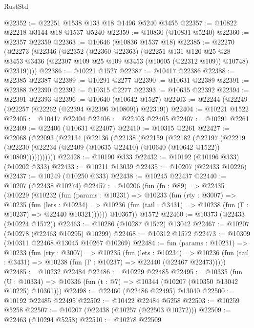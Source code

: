 \begin{lexlean}{RustStd}
\begin{coremodule}
@22352 := @22251 @1538 @133 @18 @1496 @5240 @3455
@22357 := @10822 @22218 @3144 @18 @1537 @5240
@22359 := @10830 (@10831 @5240)
@22360 := @22357 @22359
@22363 := @10646 (@10836 @1537 @18)
@22385 := @22270
    (@22273
      (@22346
        (@22352
          (@22360 @22363)
          (@22251
            @131
            @120
            @25
            @28
            @3453
            @3436
            (@22307 @109 @25 @109 @3453 (@10605 (@22312 @109)) @10748)
            @22319))))
@22386 := @10221 @1527
@22387 := @10417 @22386
@22388 := @22385 @22387
@22389 := @10291 @2277
@22390 := @10631 @22389
@22391 := @22388 @22390
@22392 := @10315 @2277
@22393 := @10635 @22392
@22394 := @22391 @22393
@22396 := @10640 (@10642 @1527)
@22403 := @22244 (@22249 (@22257 (@22262 (@22394 @22396 @10809)) @22319))
@22404 := @10221 @1522
@22405 := @10417 @22404
@22406 := @22403 @22405
@22407 := @10291 @2261
@22409 := @22406 (@10631 @22407)
@22410 := @10315 @2261
@22427 := @22068
    (@22093
      (@22134
        (@22136
          (@22138
            (@22159
              (@22182
                (@22197
                  (@22219
                    (@22230
                      (@22234 (@22409 (@10635 @22410) (@10640 (@10642 @1522)) @10809)))))))))))
@22428 := @10190 @333
@22432 := @10192 (@10196 @333) (@10202 @333)
@22433 := @10211 @13039
@22435 := @10207 (@22433 @10226)
@22437 := @10249 (@10250 @333)
@22438 := @10245 @22437
@22440 := @10207 (@22438 @10274)
@22457 := @10206
    (fun (fn : @89) =>
    @22435
      (@10229
        (@10232
          (fun (params : @10231) =>
          @10233
            (fun (rty : @3007) =>
            @10235
              (fun (lets : @10234) =>
              @10236 (fun (tail : @3431) => @10238 (fun (Γ : @10237) => @22440 @10321))))))
        @10367))
    @1572
@22460 := @10373 (@22433 (@10224 @1572))
@22463 := @10286 (@10287 @1572) @13042
@22467 := @10207 (@10278 (@22463 @10295) @10299)
@22468 := @10312 @1572
@22473 := @10309 (@10311 @22468 @13045 @10267 @10269)
@22484 := fun (params : @10231) =>
  @10233
    (fun (rty : @3007) =>
    @10235
      (fun (lets : @10234) =>
      @10236 (fun (tail : @3431) => @10238 (fun (Γ : @10237) => @22440 (@22467 @22473)))))
@22485 := @10232 @22484
@22486 := @10229 @22485
@22495 := @10335
    (fun (U : @10334) => @10336 (fun (t : @7) => @10344 (@10207 (@10350 @13042 @10225) @10361)))
@22498 := @22460 (@22486 @22495) @13040
@22500 := @10192 @22485 @22495
@22502 := @10422 @22484 @5258
@22503 := @10259 @5258
@22507 := @10207 (@22438 (@10257 (@22503 @10272)))
@22509 := @22463 (@10294 @5258)
@22510 := @10278 @22509

\end{coremodule}
\end{lexlean}
